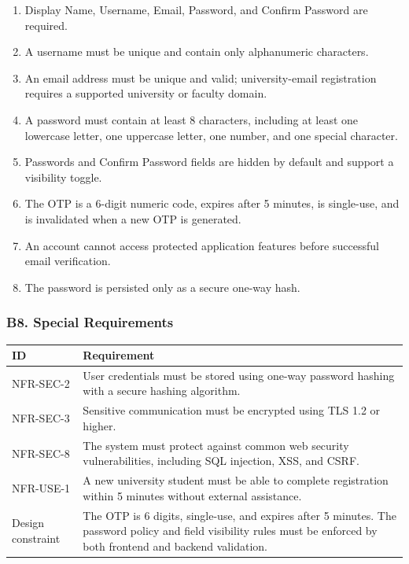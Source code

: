 \documentclass[12pt]{article}
\renewcommand{\baselinestretch}{1.5}
\begin{document}
\begin{enumerate}
\item Display Name, Username, Email, Password, and Confirm Password are required.
\item A username must be unique and contain only alphanumeric characters.
\item An email address must be unique and valid; university-email registration requires a supported university or faculty domain.
\item A password must contain at least 8 characters, including at least one lowercase letter, one uppercase letter, one number, and one special character.
\item Passwords and Confirm Password fields are hidden by default and support a visibility toggle.
\item The OTP is a 6-digit numeric code, expires after 5 minutes, is single-use, and is invalidated when a new OTP is generated.
\item An account cannot access protected application features before successful email verification.
\item The password is persisted only as a secure one-way hash.
\end{enumerate}
\par\medskip

\hypertarget{sec:b8-special-requirements}{}
\subsubsection*{B8. Special Requirements}
\par\medskip

\begingroup
\small
\renewcommand{\baselinestretch}{1.0}\selectfont
\renewcommand{\arraystretch}{1.15}
\setlength{\tabcolsep}{6pt}
\begin{longtable}{|>{\raggedright\arraybackslash}p{}|>{\raggedright\arraybackslash}p{}|}
\hline
\textbf{ID} & \textbf{Requirement} \\ \hline
\endhead
NFR-SEC-2 & User credentials must be stored using one-way password hashing with a secure hashing algorithm. \\ \hline
NFR-SEC-3 & Sensitive communication must be encrypted using TLS 1.2 or higher. \\ \hline
NFR-SEC-8 & The system must protect against common web security vulnerabilities, including SQL injection, XSS, and CSRF. \\ \hline
NFR-USE-1 & A new university student must be able to complete registration within 5 minutes without external assistance. \\ \hline
Design constraint & The OTP is 6 digits, single-use, and expires after 5 minutes. The password policy and field visibility rules must be enforced by both frontend and backend validation. \\ \hline
\end{longtable}
\endgroup
\par\medskip
\end{document}
